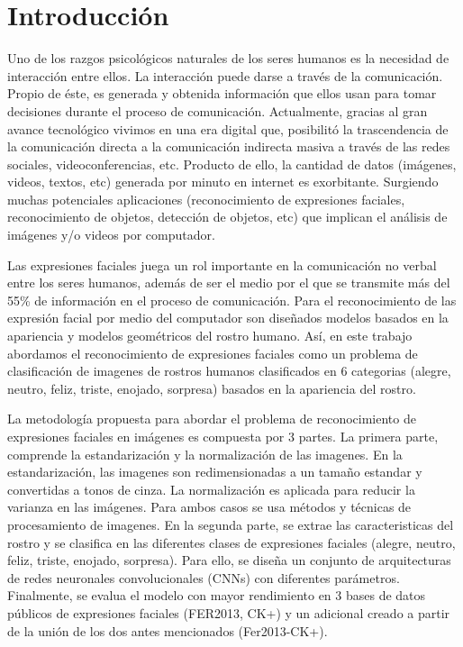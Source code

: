 \chapter*{Introducción}
Uno de los razgos psicológicos naturales de los seres humanos es la necesidad de interacción entre ellos. La interacción puede darse a través de la comunicación. Propio de éste, es generada y obtenida información que ellos usan para tomar decisiones durante el proceso de comunicación. Actualmente, gracias al gran avance tecnológico vivimos en una era digital que, posibilitó la trascendencia de la comunicación directa a la comunicación indirecta masiva a través de las redes sociales, videoconferencias, etc. Producto de ello, la cantidad de datos (imágenes, videos, textos, etc) generada por minuto en internet es exorbitante. Surgiendo muchas potenciales aplicaciones (reconocimiento de expresiones faciales, reconocimiento de objetos, detección de objetos, etc) que implican el análisis de imágenes y/o videos por computador. 

Las expresiones faciales juega un rol importante en la comunicación no verbal entre los seres humanos, además de ser el medio por el que se transmite más del 55\% de información en el proceso  de comunicación. Para el reconocimiento de las expresión facial por medio del computador son diseñados modelos basados en la apariencia y modelos geométricos del rostro humano.
Así, en este trabajo abordamos el reconocimiento de expresiones faciales como un problema de clasificación de imagenes de rostros humanos clasificados en 6 categorias (alegre, neutro, feliz, triste, enojado, sorpresa) basados en la apariencia del rostro.

La metodología propuesta  para abordar el problema de reconocimiento de expresiones faciales en imágenes es compuesta por 3 partes. La primera parte, comprende la estandarización y la normalización de las imagenes. En la estandarización, las imagenes son redimensionadas a un tamaño estandar y convertidas a tonos de cinza. La normalización es aplicada para reducir la varianza en las imágenes. Para ambos casos se usa métodos y técnicas de procesamiento de imagenes. En la segunda parte, se extrae las caracteristicas del rostro y se clasifica en las diferentes clases de expresiones faciales (alegre, neutro, feliz, triste, enojado, sorpresa). Para ello, se diseña un conjunto de arquitecturas de redes neuronales convolucionales (CNNs) con diferentes parámetros. Finalmente, se evalua el modelo con mayor rendimiento en 3 bases de datos públicos de expresiones faciales (FER2013, CK+) y un adicional creado a partir de la unión de los dos antes mencionados (Fer2013-CK+). 


